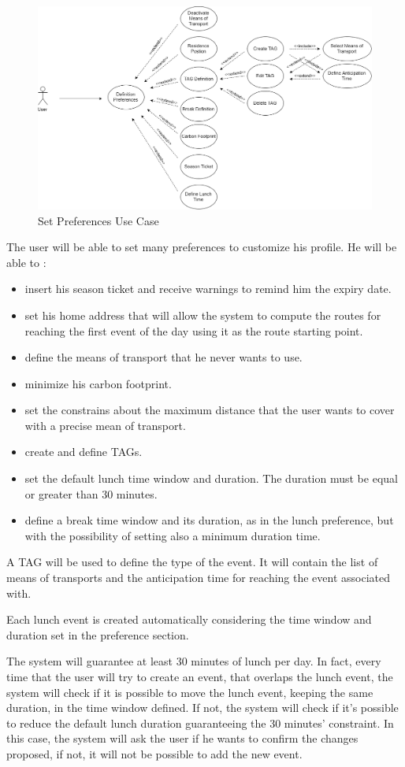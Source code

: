 \begin{figure}[H]
	\centering
	\includegraphics[scale=0.25]{Images/Use_Case/Set_Preferences}
	\caption{Set Preferences Use Case}
\end{figure}
The user will be able to set many preferences to customize his profile. 
He will be able to :
\begin{itemize}
	\setlength{\leftskip}{1cm}
	\item insert his season ticket and receive warnings to remind him the expiry date.
	\item set his home address that will allow the system to compute the routes for reaching the first event of the day using it as the route starting point.
	\item define the means of transport that he never wants to use.
	\item minimize his carbon footprint.
	\item set the constrains about the maximum distance that the user wants to cover with a precise mean of transport.
	\item create and define TAGs.
	\item set the default lunch time window and duration. The duration must be equal or greater than 30 minutes.
	\item define a break time window and its duration, as in the lunch preference, but with the possibility of setting also a minimum duration time.
\end{itemize}\par
A TAG will be used to define the type of the event. It will contain the list of means of transports and the anticipation time for reaching the event associated with.

\newpage
{}
Each lunch event is created automatically considering the time window and duration set in the preference section.\par
The system will guarantee at least 30 minutes of lunch per day. In fact, every time that the user will try to create an event, that overlaps the lunch event, the system will check if it is possible to move the lunch event, keeping the same duration, in the time window defined. If not, the system will check if it’s possible to reduce the default lunch duration guaranteeing the 30 minutes’ constraint. In this case, the system will ask the user if he wants to confirm the changes proposed, if not, it will not be possible to add the new event.

